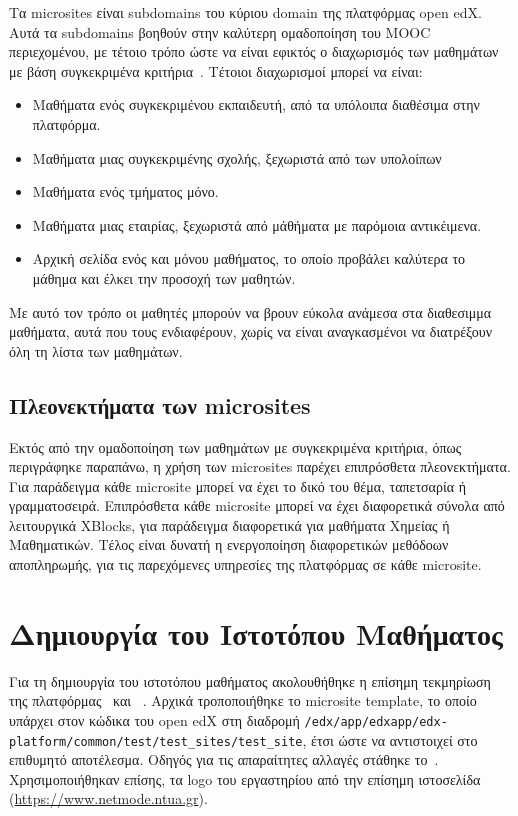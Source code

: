 \documentclass[12pt]{report}
\begin{document}
Τα \textlatin{microsites} είναι \textlatin{subdomains} του κύριου domain της πλατφόρμας \textlatin{open edX}. Αυτά τα \textlatin{subdomains} βοηθούν στην καλύτερη ομαδοποίηση του \textlatin{MOOC} περιεχομένου, με τέτοιο τρόπο ώστε να είναι εφικτός ο διαχωρισμός των μαθημάτων με βάση συγκεκριμένα κριτήρια~\cite{microsites_2}. Τέτοιοι διαχωρισμοί μπορεί να είναι:
\begin{itemize}
  \item Μαθήματα ενός συγκεκριμένου εκπαιδευτή, από τα υπόλοιπα διαθέσιμα στην πλατφόρμα.
  \item Μαθήματα μιας συγκεκριμένης σχολής, ξεχωριστά από των υπολοίπων
  \item Μαθήματα ενός τμήματος μόνο.
  \item Μαθήματα μιας εταιρίας, ξεχωριστά από μάθήματα με παρόμοια αντικέιμενα.
  \item Αρχική σελίδα ενός και μόνου μαθήματος, το οποίο προβάλει καλύτερα το μάθημα και έλκει την προσοχή των μαθητών.
\end{itemize}
Με αυτό τον τρόπο οι μαθητές μπορούν να βρουν εύκολα ανάμεσα στα διαθεσιμμα μαθήματα, αυτά που τους ενδιαφέρουν, χωρίς να είναι αναγκασμένοι να διατρέξουν όλη τη λίστα των μαθημάτων.

\subsection{Πλεονεκτήματα των \textlatin{microsites}}
Εκτός από την ομαδοποίηση των μαθημάτων με συγκεκριμένα κριτήρια, όπως περιγράφηκε παραπάνω, η χρήση των \textlatin{microsites} παρέχει επιπρόσθετα πλεονεκτήματα. Για παράδειγμα κάθε \textlatin{microsite} μπορεί να έχει το δικό του θέμα, ταπετσαρία ή γραμματοσειρά. Επιπρόσθετα κάθε \textlatin{microsite} μπορεί να έχει διαφορετικά σύνολα από λειτουργικά \textlatin{XBlocks}, για παράδειγμα διαφορετικά για μαθήματα Χημείας ή Μαθηματικών. Τέλος είναι δυνατή η ενεργοποίηση διαφορετικών μεθόδοων αποπληρωμής, για τις παρεχόμενες υπηρεσίες της πλατφόρμας σε κάθε \textlatin{microsite}.

\section{Δημιουργία του Ιστοτόπου Μαθήματος}
Για τη δημιουργία του ιστοτόπου μαθήματος ακολουθήθηκε η επίσημη τεκμηρίωση της πλατφόρμας~\cite{edxdata_package_1} και ~\cite{microsites_1}. Αρχικά τροποποιήθηκε το \textlatin{microsite template}, το οποίο υπάρχει στον κώδικα του \textlatin{open edX} στη διαδρομή \textlatin{\texttt{/edx/app/edxapp/edx-platform/common/test/test\_sites/test\_site}}, έτσι ώστε να αντιστοιχεί στο επιθυμητό αποτέλεσμα. Οδηγός για τις απαραίτητες αλλαγές στάθηκε το~\cite{microsites_1}. Χρησιμοποιήθηκαν επίσης, τα \textlatin{logo} του εργαστηρίου από την επίσημη ιστοσελίδα (\textlatin{\url{https://www.netmode.ntua.gr}}).
\end{document}

